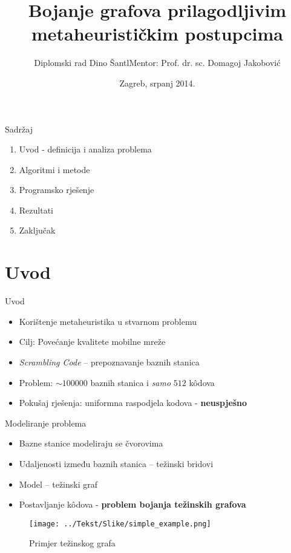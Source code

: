 \documentclass[utf8]{beamer}
\title[Bojanje grafova prilagodljivim metaheurističkim postupcima]{Bojanje grafova prilagodljivim metaheurističkim postupcima}
\author[Dino Šantl]{Diplomski rad \newline\newline Dino Šantl\newline Mentor: Prof. dr. sc. Domagoj Jakobović}
\institute{Fakultet elektrotehnike i računarstva}
\date{Zagreb, srpanj 2014.}
\begin{document}
\begin{frame}
\titlepage
\end{frame}

\section*{}
\begin{frame}{Sadržaj}
	\begin{enumerate}
		\item Uvod - definicija i analiza problema
		\item Algoritmi i metode
		\item Programsko rješenje
		\item Rezultati
		\item Zaključak
	\end{enumerate}
\end{frame}


\section{Uvod}
\begin{frame}{Uvod}
	\begin{itemize}
		\item Korištenje metaheuristika u stvarnom problemu
		\pause
		\item Cilj: Povećanje kvalitete mobilne mreže
		\pause
		\item \emph{Scrambling Code} -- prepoznavanje baznih stanica 
		\pause
		\item Problem: $\sim 100000$ baznih stanica i \emph{samo} $512$ k\^{o}dova
		\pause
		\item Pokušaj rješenja: uniformna raspodjela kodova - \textbf{neuspješno} 
	\end{itemize}
\end{frame}

\begin{frame}{Modeliranje problema}
	\begin{itemize}
		\item Bazne stanice modeliraju se čvorovima
		\pause
		\item Udaljenosti između baznih stanica -- težinski bridovi
		\pause
		\item Model -- težinski graf
		\pause
		\item Postavljanje k\^{o}dova - \textbf{problem bojanja težinskih grafova}
	\end{itemize}
	\begin{figure}[h]
  \caption{Primjer težinskog grafa}
  \centering
    \texttt{[image: ../Tekst/Slike/simple\_example.png]}
	\end{figure}
\end{frame}
\end{document}
